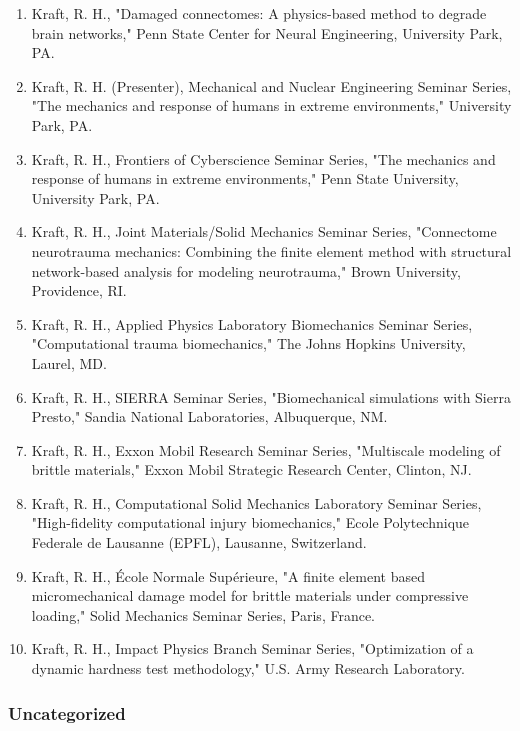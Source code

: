 \documentclass[
]{article}
\begin{document}
\begin{enumerate}
\item
  Kraft, R. H., "Damaged connectomes: A physics-based method to degrade
  brain networks," Penn State Center for Neural Engineering, University
  Park, PA.
\item
  Kraft, R. H. (Presenter), Mechanical and Nuclear Engineering Seminar
  Series, "The mechanics and response of humans in extreme
  environments," University Park, PA.
\item
  Kraft, R. H., Frontiers of Cyberscience Seminar Series, "The mechanics
  and response of humans in extreme environments," Penn State
  University, University Park, PA.
\item
  Kraft, R. H., Joint Materials/Solid Mechanics Seminar Series,
  "Connectome neurotrauma mechanics: Combining the finite element method
  with structural network-based analysis for modeling neurotrauma,"
  Brown University, Providence, RI.
\item
  Kraft, R. H., Applied Physics Laboratory Biomechanics Seminar Series,
  "Computational trauma biomechanics," The Johns Hopkins University,
  Laurel, MD.
\item
  Kraft, R. H., SIERRA Seminar Series, "Biomechanical simulations with
  Sierra Presto," Sandia National Laboratories, Albuquerque, NM.
\item
  Kraft, R. H., Exxon Mobil Research Seminar Series, "Multiscale
  modeling of brittle materials," Exxon Mobil Strategic Research Center,
  Clinton, NJ.
\item
  Kraft, R. H., Computational Solid Mechanics Laboratory Seminar Series,
  "High-fidelity computational injury biomechanics," Ecole Polytechnique
  Federale de Lausanne (EPFL), Lausanne, Switzerland.
\item
  Kraft, R. H., École Normale Supérieure, "A finite element based
  micromechanical damage model for brittle materials under compressive
  loading," Solid Mechanics Seminar Series, Paris, France.
\item
  Kraft, R. H., Impact Physics Branch Seminar Series, "Optimization of a
  dynamic hardness test methodology," U.S. Army Research Laboratory.
\end{enumerate}

\subsubsection{Uncategorized}\label{uncategorized}
\end{document}
